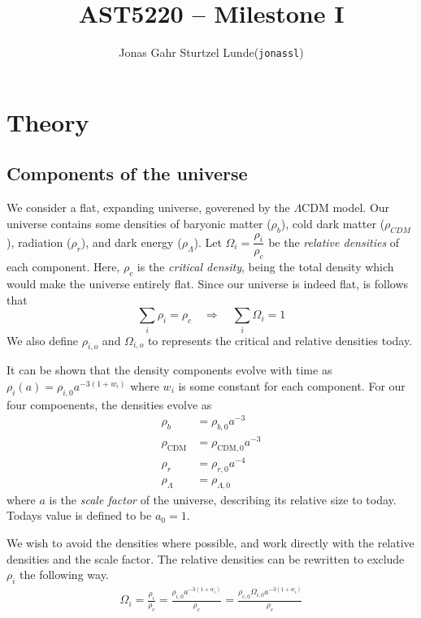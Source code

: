 \documentclass[10pt, a4paper]{article}
\begin{document}
\title{AST5220 -- Milestone I}
\author{
    \begin{tabular}{r l}
        Jonas Gahr Sturtzel Lunde & (\texttt{jonassl})
    \end{tabular}}

\maketitle
\vspace{2cm}

\section{Theory}
\subsection{Components of the universe}
We consider a flat, expanding universe, goverened by the $\Lambda \text{CDM}$ model. Our universe contains some densities of baryonic matter ($\rho_b$), cold dark matter ($\rho_{CDM}$), radiation ($\rho_r$), and dark energy ($\rho_\Lambda$). Let $\Omega_i = \dfrac{\rho_i}{\rho_c}$ be the \textit{relative densities} of each component. Here, $\rho_c$ is the \textit{critical density}, being the total density which would make the universe entirely flat. Since our universe is indeed flat, is follows that
\begin{equation*}
    \sum_i \rho_i = \rho_c \quad \Rightarrow \quad \sum_i \Omega_i = 1
\end{equation*}
We also define $\rho_{i,o}$ and $\Omega_{i,o}$ to represents the critical and relative densities today.

It can be shown that the density components evolve with time as $\rho_i(a) = \rho_{i,0}a^{-3(1+w_i)}$ where $w_i$ is some constant for each component. For our four compoenents, the densities evolve as
\begin{align*}
    \rho_b &= \rho_{b,0} a^{-3} \\
    \rho_\text{CDM} &= \rho_{\text{CDM},0} a^{-3} \\
    \rho_r &= \rho_{r,0} a^{-4} \\
    \rho_\Lambda &= \rho_{\Lambda,0}
\end{align*}
where $a$ is the \textit{scale factor} of the universe, describing its relative size to today. Todays value is defined to be $a_0 = 1$.

We wish to avoid the densities where possible, and work directly with the relative densities and the scale factor. The relative densities can be rewritten to exclude $\rho_i$ the following way.
\begin{align*}
    \Omega_{i} = \frac{\rho_i}{\rho_c} = \frac{\rho_{i,0}a^{-3(1+w_i)}}{\rho_c} = \frac{\rho_{c,0}\Omega_{i,0}a^{-3(1+w_i)}}{\rho_c}
\end{align*}
\end{document}
